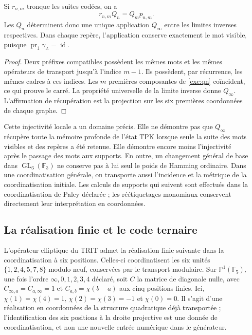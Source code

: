\begin{proposition}
\label{exc:limite-inverso}
Si $r_{n,m}$ tronque les suites codées, on a
\[
 r_{n,m}Q_n=Q_m p_{n,m}.
\]
Les $Q_n$ déterminent donc une unique application $Q_\infty$ entre les limites inverses respectives. Dans chaque repère, l'application conserve exactement le mot visible, puisque $\operatorname{pr}_1\gamma_A=\operatorname{id}$.
\end{proposition}

\begin{proof}
Deux préfixes compatibles possèdent les mêmes mots et les mêmes
opérateurs de transport jusqu'à l'indice $m-1$. Ils possèdent, par récurrence,
les mêmes cadres à ces indices. Les $m$ premières composantes de
\eqref{exc:qn} coïncident, ce qui prouve le carré. La propriété
universelle de la limite inverse donne $Q_\infty$. L'affirmation de récupération
est la projection sur les six premières coordonnées de chaque graphe.
\end{proof}

Cette injectivité locale a un domaine précis. Elle ne démontre pas que
$Q_\infty$ récupère toute la mémoire profonde de l'état TPK lorsque seule
la suite des mots visibles et des repères a été retenue. Elle démontre encore moins
l'injectivité après le passage des mots aux supports.
En outre, un changement général de base dans $\operatorname{GL}_6(\mathbb F_3)$
ne conserve pas à lui seul le poids de Hamming ordinaire. Dans une coordinatisation
générale, on transporte aussi l'incidence et la métrique de la coordinatisation
initiale. Les calculs de supports qui suivent sont effectués dans la coordinatisation
de Paley déclarée ; les réétiquetages monomiaux conservent directement leur
interprétation en coordonnées.

\subsection{La réalisation finie et le code ternaire}
\label{exc:paley-codigo}

L'opérateur elliptique du TRIT admet la réalisation finie suivante dans
la coordinatisation à six positions. Celles-ci coordinatisent les six unités
$\{1,2,4,5,7,8\}$ modulo neuf, conservées par le transport modulaire.
Sur $\mathbb P^1(\mathbb F_5)$, une fois
l'ordre $\infty,0,1,2,3,4$ déclaré, soit $C$ la matrice de diagonale
nulle, avec $C_{\infty,a}=C_{a,\infty}=1$ et
$C_{a,b}=\chi(b-a)$ aux cinq positions finies. Ici,
$\chi(1)=\chi(4)=1$, $\chi(2)=\chi(3)=-1$ et $\chi(0)=0$.
Il s'agit d'une réalisation en coordonnées de la structure quadratique déjà
transportée ; l'identification des six positions à la droite
projective est une donnée de coordinatisation, et non une nouvelle entrée numérique dans le
générateur.

